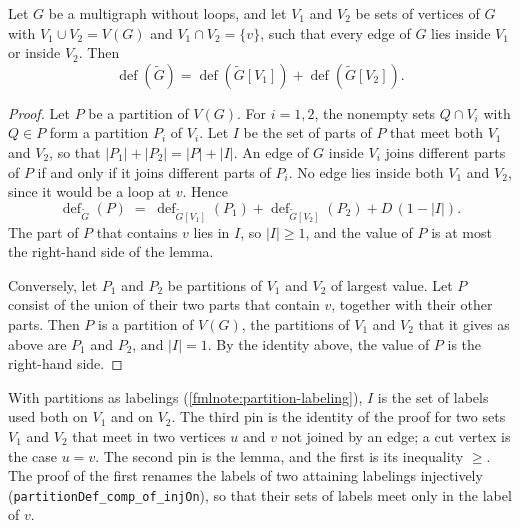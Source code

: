 \begin{lemma}
  \label{lem:deficiency-cut-vertex}
  \leanok
  Let $G$ be a multigraph without loops, and let $V_1$ and $V_2$ be sets
  of vertices of $G$ with $V_1 \cup V_2 = V(G)$ and
  $V_1 \cap V_2 = \{v\}$, such that every edge of $G$ lies inside $V_1$
  or inside $V_2$. Then
  \[
    \operatorname{def}(\tilde G)
    = \operatorname{def}(\tilde G[V_1]) + \operatorname{def}(\tilde G[V_2]).
  \]
\end{lemma}
\begin{proof}
  \leanok
  Let $P$ be a partition of $V(G)$. For $i = 1, 2$, the nonempty sets
  $Q \cap V_i$ with $Q \in P$ form a partition $P_i$ of $V_i$. Let $I$ be
  the set of parts of $P$ that meet both $V_1$ and $V_2$, so that
  $|P_1| + |P_2| = |P| + |I|$. An edge of $G$ inside $V_i$ joins
  different parts of $P$ if and only if it joins different parts of
  $P_i$. No edge lies inside both $V_1$ and $V_2$, since it would be a
  loop at $v$. Hence
  \[
    \operatorname{def}_{\tilde G}(P) \;=\;
    \operatorname{def}_{\tilde G[V_1]}(P_1)
    + \operatorname{def}_{\tilde G[V_2]}(P_2) + D\,(1 - |I|).
  \]
  The part of $P$ that contains $v$ lies in $I$, so $|I| \ge 1$, and the
  value of $P$ is at most the right-hand side of the lemma.

  Conversely, let $P_1$ and $P_2$ be partitions of $V_1$ and $V_2$ of
  largest value. Let $P$ consist of the union of their two parts that
  contain $v$, together with their other parts. Then $P$ is a partition
  of $V(G)$, the partitions of $V_1$ and $V_2$ that it gives as above are
  $P_1$ and $P_2$, and $|I| = 1$. By the identity above, the value of $P$
  is the right-hand side.
\end{proof}
\begin{fmlnote}
  With partitions as labelings (\cref{fmlnote:partition-labeling}), $I$
  is the set of labels used both on $V_1$ and on $V_2$. The third pin is
  the identity of the proof for two sets $V_1$ and $V_2$ that meet in two
  vertices $u$ and $v$ not joined by an edge; a cut vertex is the case
  $u = v$. The second pin is the lemma, and the first is its inequality
  $\ge$. The proof of the first renames the labels of two attaining
  labelings injectively
  (\texttt{partitionDef\_\allowbreak{}comp\_\allowbreak{}of\_\allowbreak{}injOn}),
  so that their sets of labels meet only in the label of $v$.
\end{fmlnote}

